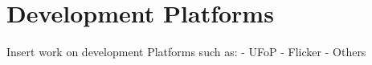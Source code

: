 \section{Development Platforms} %
\label{sec:development_platforms}


Insert work on development Platforms such as:
- UFoP \cite{ufop}
- Flicker \cite{flicker}
- Others
